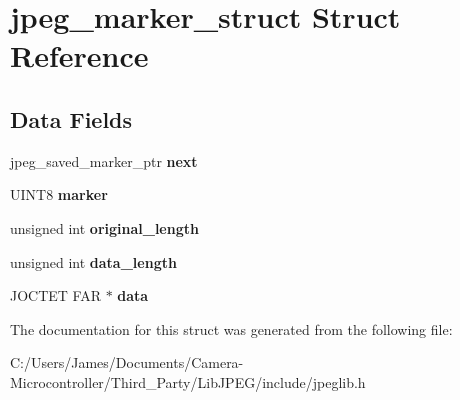 \hypertarget{structjpeg__marker__struct}{}\section{jpeg\+\_\+marker\+\_\+struct Struct Reference}
\label{structjpeg__marker__struct}
\subsection*{Data Fields}
\begin{DoxyCompactItemize}
\item 
\mbox{\label{structjpeg__marker__struct_ad92d8d937abbb4c69489e1717cf15bb1}} 
jpeg\+\_\+saved\+\_\+marker\+\_\+ptr {\bfseries next}
\item 
\mbox{\label{structjpeg__marker__struct_a8fb0147faab5b70c5fa71e7efcef3d3d}} 
U\+I\+N\+T8 {\bfseries marker}
\item 
\mbox{\label{structjpeg__marker__struct_a93de63eb2dde11b6eb43086353c6e190}} 
unsigned int {\bfseries original\+\_\+length}
\item 
\mbox{\label{structjpeg__marker__struct_a6e455df9b373a99a0b22b05dd76c38b1}} 
unsigned int {\bfseries data\+\_\+length}
\item 
\mbox{\label{structjpeg__marker__struct_a27bae7e31e921d421e46eb2da508407d}} 
J\+O\+C\+T\+ET F\+AR $\ast$ {\bfseries data}
\end{DoxyCompactItemize}


The documentation for this struct was generated from the following file\+:\begin{DoxyCompactItemize}
\item 
C\+:/\+Users/\+James/\+Documents/\+Camera-\/\+Microcontroller/\+Third\+\_\+\+Party/\+Lib\+J\+P\+E\+G/include/jpeglib.\+h\end{DoxyCompactItemize}
